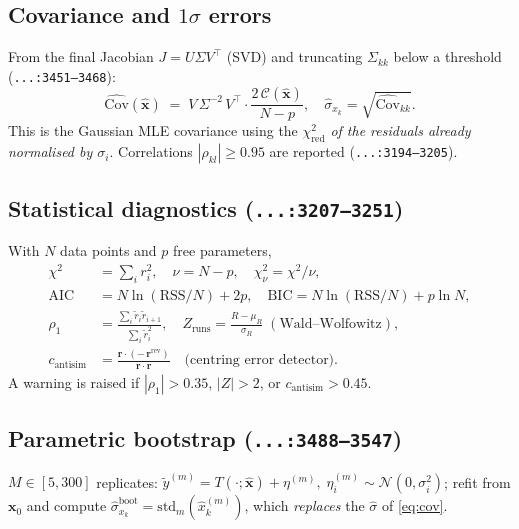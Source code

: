 \documentclass[11pt,a4paper]{article}
\newcommand{\file}[1]{\textcolor{black!70}{\texttt{\small #1}}}
\begin{document}
\subsection{Covariance and $1\sigma$ errors}\label{sec:cov}
From the final Jacobian $J=U\Sigma V^{\top}$ (SVD) and truncating $\Sigma_{kk}$ below a threshold (\file{...:3451--3468}):
\begin{equation}
  \boxed{\;
  \widehat{\mathrm{Cov}}(\hat{\bm x}) \;=\; V\,\Sigma^{-2}\,V^{\top}\cdot \frac{2\,\mathcal C(\hat{\bm x})}{N-p},
  \quad
  \hat\sigma_{x_k} = \sqrt{\widehat{\mathrm{Cov}}_{kk}}.
  \;}
  \label{eq:cov}
\end{equation}
This is the Gaussian MLE covariance using the $\chi^{2}_{\text{red}}$ \emph{of the residuals already normalised by $\sigma_i$}. Correlations $|\rho_{kl}|\ge 0{.}95$ are reported (\file{...:3194--3205}).

\subsection{Statistical diagnostics (\file{...:3207--3251})}
With $N$ data points and $p$ free parameters,
\begin{align}
  \chi^{2} &= \textstyle\sum_i r_i^{2}, \quad
  \nu = N - p, \quad
  \chi^{2}_\nu = \chi^{2}/\nu,\\
  \mathrm{AIC} &= N\ln(\mathrm{RSS}/N) + 2p, \quad
  \mathrm{BIC} = N\ln(\mathrm{RSS}/N) + p\ln N,\\
  \rho_1 &= \frac{\sum_i \tilde r_i \tilde r_{i+1}}{\sum_i \tilde r_i^{2}},
  \quad Z_{\text{runs}} = \frac{R-\mu_R}{\sigma_R}\;(\text{Wald--Wolfowitz}),\\
  c_{\text{antisim}} &= \frac{\bm r \cdot (-\,\bm r^{\text{rev}})}{\bm r\cdot\bm r} \quad\text{(centring error detector).}
\end{align}
A warning is raised if $|\rho_1|>0{.}35$, $|Z|>2$, or $c_{\text{antisim}}>0{.}45$.

\subsection{Parametric bootstrap (\file{...:3488--3547})}
$M\in[5,300]$ replicates: $\tilde y^{(m)} = T(\cdot;\hat{\bm x})+\eta^{(m)},\;\eta^{(m)}_i\sim\mathcal N(0,\sigma_i^{2})$; refit from $\bm x_0$ and compute
\(\hat\sigma_{x_k}^{\text{boot}} = \text{std}_m(\hat x_k^{(m)})\), which \emph{replaces} the $\hat\sigma$ of \eqref{eq:cov}.

\end{document}
